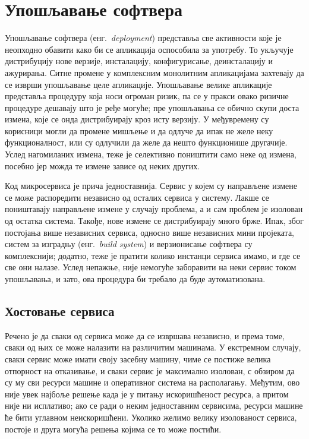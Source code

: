 \documentclass[12pt,oneside]{memoir}
\begin{document}
\section{Упошљавање софтвера}
Упошљавање софтвера (енг.~\textit{deployment}) представља све активности које је неопходно обавити како би се апликација оспособила за употребу. То укључује дистрибуцију нове верзије, инсталацију, конфигурисање, деинсталацију и ажурирања. Ситне промене у комплексним монолитним апликацијама захтевају да се изврши упошљавање целе апликације. Упошљавање велике апликације представља процедуру која носи огроман ризик, па се у пракси овако ризичне процедуре дешавају што је ређе могуће; пре упошљавања се обично скупи доста измена, које се онда дистрибуирају кроз исту верзију. У међувремену су корисници могли да промене мишљење и да одлуче да ипак не желе неку функционалност, или су одлучили да желе да нешто функционише другачије. Услед нагомиланих измена, теже је селективно поништити само неке од измена, посебно јер можда те измене зависе од неких других.

Код микросервиса је прича једноставнија. Сервис у којем су направљене измене се може распоредити независно од осталих сервиса у систему. Лакше се поништавају направљене измене у случају проблема, а и сам проблем је изолован од остатка система. Такође, нове измене се дистрибуирају много брже. Ипак, због постојања више независних сервиса, односно више независних мини пројеката, систем за изградњу (енг.~\textit{build system}) и верзионисање софтвера су комплекснији; додатно, теже је пратити колико инстанци сервиса имамо, и где се све они налазе. Услед непажње, није немогуће заборавити на неки сервис током упошљавања, и зато, ова процедура би требало да буде аутоматизована.

\subsection{Хостовање сервиса}\label{hostovanjeservisa}
Речено је да сваки од сервиса може да се извршава независно, и према томе, сваки од њих се може налазити на различитим машинама. У екстремном случају, сваки сервис може имати своју засебну машину, чиме се постиже велика отпорност на отказивање, и сваки сервис је максимално изолован, с обзиром да су му сви ресурси машине и оперативног система на располагању. Међутим, ово није увек најбоље решење када је у питању искоришћеност ресурса, а притом није ни исплативо; ако се ради о неким једноставним сервисима, ресурси машине ће бити углавном неискоришћени. Уколико желимо велику изолованост сервиса, постоје и друга могућа решења којима се то може постићи.
\end{document}
